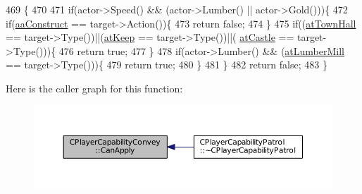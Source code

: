 \begin{DoxyCode}
469                                                                                                            
                                                   \{
470 
471     \textcolor{keywordflow}{if}(actor->Speed() && (actor->Lumber() || actor->Gold()))\{
472         \textcolor{keywordflow}{if}(\hyperlink{GameDataTypes_8h_ab47668e651a3032cfb9c40ea2d60d670a7ef6b863f66dd7dcc95a199cd758ae1d}{aaConstruct} == target->Action())\{
473             \textcolor{keywordflow}{return} \textcolor{keyword}{false};
474         \}
475         \textcolor{keywordflow}{if}((\hyperlink{GameDataTypes_8h_a5600d4fc433b83300308921974477feca5c0fa8a0f367f3358365536d3c7aa321}{atTownHall} == target->Type())||(\hyperlink{GameDataTypes_8h_a5600d4fc433b83300308921974477fecaaed39451bedb0392ad95fbc9c95bef31}{atKeep} == target->Type())||(
      \hyperlink{GameDataTypes_8h_a5600d4fc433b83300308921974477feca6727b47855e74f3f7b6e4a96d0c2a42a}{atCastle} == target->Type()))\{
476             \textcolor{keywordflow}{return} \textcolor{keyword}{true};
477         \}
478         \textcolor{keywordflow}{if}(actor->Lumber() && (\hyperlink{GameDataTypes_8h_a5600d4fc433b83300308921974477feca7bb38316bc3193b5c9ec67ea6aad549c}{atLumberMill} == target->Type()))\{
479             \textcolor{keywordflow}{return} \textcolor{keyword}{true};    
480         \}
481     \}
482     \textcolor{keywordflow}{return} \textcolor{keyword}{false};
483 \}
\end{DoxyCode}
Here is the caller graph for this function\+:
\nopagebreak
\begin{figure}[H]
\begin{center}
\leavevmode
\includegraphics[width=350pt]{classCPlayerCapabilityConvey_a795b3eb4c3879a6d7da1cba7962a1c78_icgraph}
\end{center}
\end{figure}
\hypertarget{classCPlayerCapabilityConvey_a6c5ebd62a9c3a619c56e070aca5443a7}{}\label{classCPlayerCapabilityConvey_a6c5ebd62a9c3a619c56e070aca5443a7} 

